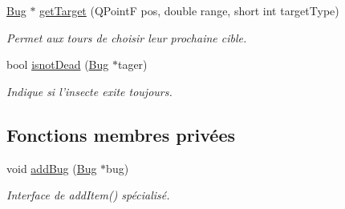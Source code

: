 \begin{DoxyCompactItemize}
\hyperlink{classBug}{Bug} $\ast$ \hyperlink{classRender_a8074fc252757d5c446d79f8205348116}{getTarget} (QPointF pos, double range, short int targetType)
\begin{DoxyCompactList}\small\item\em Permet aux tours de choisir leur prochaine cible. \end{DoxyCompactList}\item 
bool \hyperlink{classRender_a8b8e53278c49bf3a65704b0913eaaefc}{isnotDead} (\hyperlink{classBug}{Bug} $\ast$tager)
\begin{DoxyCompactList}\small\item\em Indique si l'insecte exite toujours. \end{DoxyCompactList}\end{DoxyCompactItemize}
\subsection*{Fonctions membres privées}
\begin{DoxyCompactItemize}
\item 
void \hyperlink{classRender_a4a1fed13f76997e45e90dd39d622d33e}{addBug} (\hyperlink{classBug}{Bug} $\ast$bug)
\begin{DoxyCompactList}\small\item\em Interface de addItem() spécialisé. \end{DoxyCompactList}\end{DoxyCompactItemize}
